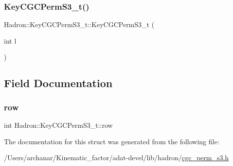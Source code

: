 \mbox{\label{structHadron_1_1KeyCGCPermS3__t_af58d8b287b6da4b7998735e67be0f1f9}} 
\subsubsection{\texorpdfstring{KeyCGCPermS3\_t()}{KeyCGCPermS3\_t()}\hspace{0.1cm}{\footnotesize\ttfamily [6/6]}}
{\footnotesize\ttfamily Hadron\+::\+Key\+C\+G\+C\+Perm\+S3\+\_\+t\+::\+Key\+C\+G\+C\+Perm\+S3\+\_\+t (\begin{DoxyParamCaption}\item[{int}]{l }\end{DoxyParamCaption})\hspace{0.3cm}{\ttfamily [inline]}}



\subsection{Field Documentation}
\mbox{\label{structHadron_1_1KeyCGCPermS3__t_ae42674e0246b466965e187a7210cd8e2}} 
\subsubsection{\texorpdfstring{row}{row}}
{\footnotesize\ttfamily int Hadron\+::\+Key\+C\+G\+C\+Perm\+S3\+\_\+t\+::row}



The documentation for this struct was generated from the following file\+:\begin{DoxyCompactItemize}
\item 
/\+Users/archanar/\+Kinematic\+\_\+factor/adat-\/devel/lib/hadron/\mbox{\hyperlink{adat-devel_2lib_2hadron_2cgc__perm__s3_8h}{cgc\+\_\+perm\+\_\+s3.\+h}}\end{DoxyCompactItemize}
